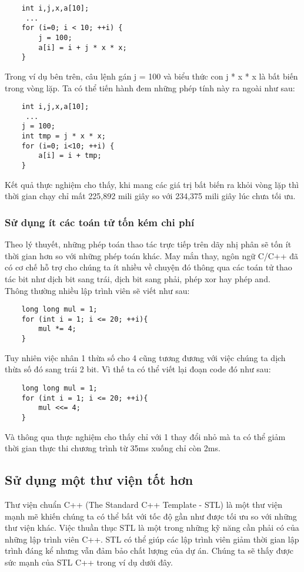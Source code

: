 \documentclass{article}
\begin{document}
\begin{verbatim}
    int i,j,x,a[10];
     ...
    for (i=0; i < 10; ++i) {
        j = 100;
        a[i] = i + j * x * x;
    }
\end{verbatim}

Trong ví dụ bên trên, câu lệnh gán j = 100 và biểu thức con j * x * x là bất biến trong vòng lặp. Ta có thể tiến hành đem những phép tính này ra ngoài như sau: \\

\begin{verbatim}
    int i,j,x,a[10];
     ...
    j = 100;
    int tmp = j * x * x;
    for (i=0; i<10; ++i) {
        a[i] = i + tmp;
    }
\end{verbatim}

Kết quả thực nghiệm cho thấy, khi mang các giá trị bất biến ra khỏi vòng lặp thì thời gian chạy chỉ mất 225,892 mili giây so với 234,375 mili giây lúc chưa tối ưu.

\subsubsection{Sử dụng ít các toán tử tốn kém chi phí}
Theo lý thuyết, những phép toán thao tác trực tiếp trên dãy nhị phân sẽ tốn ít thời gian hơn so với những phép toán khác. May mắn thay, ngôn ngữ C/C++ đã có cơ chế hỗ trợ cho chúng ta ít nhiều về chuyện đó thông qua các toán tử thao tác bit như dịch bit sang trái, dịch bit sang phải, phép xor hay phép and.\\

Thông thường nhiều lập trình viên sẽ viết như sau:
\begin{verbatim}
    long long mul = 1;
    for (int i = 1; i <= 20; ++i){ 
        mul *= 4;
    }
\end{verbatim}
Tuy nhiên việc nhân 1 thừa số cho 4 cũng tương đương với việc chúng ta dịch thừa số đó sang trái 2 bit. Vì thế ta có thể viết lại đoạn code đó như sau:
\begin{verbatim}
    long long mul = 1;
    for (int i = 1; i <= 20; ++i){ 
        mul <<= 4;
    }
\end{verbatim}
Và thông qua thực nghiệm cho thấy chỉ với 1 thay đổi nhỏ mà ta có thể giảm thời gian thực thi chương trình từ 35ms xuống chỉ còn 2ms.
\subsection{Sử dụng một thư viện tốt hơn}
Thư viện chuẩn C++ (The Standard C++ Template - STL) là một thư viện mạnh mẽ khiến chúng ta có thể bất với tốc độ gần như được tối ưu so với những thư viện khác. Việc thuần thục STL là một trong những kỹ năng cần phải có của những lập trình viên C++. STL có thể giúp các lập trình viên giảm thời gian lập trình đáng kể nhưng vẫn đảm bảo chất lượng của dự án. Chúng ta sẽ thấy được sức mạnh của STL C++ trong ví dụ dưới đây.\\
\end{document}
